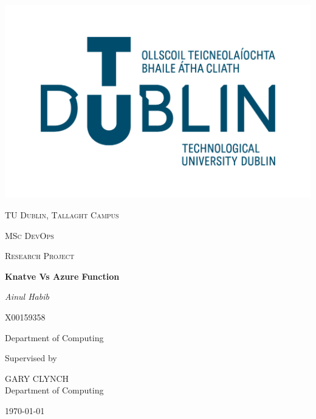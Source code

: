 \documentclass{article}
\begin{document}
\thispagestyle{empty}
\setlength\headheight{0pt} 
\begin{center}

\begin{center}
\includegraphics[width=0.65\linewidth]{images/TUD_Logo.png}            
\end{center}	

        \vspace{0.25cm}
        {\scshape\LARGE TU Dublin, Tallaght Campus \par}
        \vspace{0.25cm}
        {\scshape\Large MSc DevOps\par}
        {\scshape\Large Research Project }
        \vspace{0.5cm}

        {\Large\bfseries Knatve Vs Azure Function\par}
        
        \vspace{0.5cm}
        {\Large\itshape Ainul Habib\par}
        {\scshape\small X00159358 \par}
        Department of Computing
        \vspace{0.25cm}

\vspace{1cm}
Supervised by\par
GARY CLYNCH \\
Department of Computing\par
\large
\today

\end{center}

\clearpage
\restoregeometry
\justify
\end{document}
